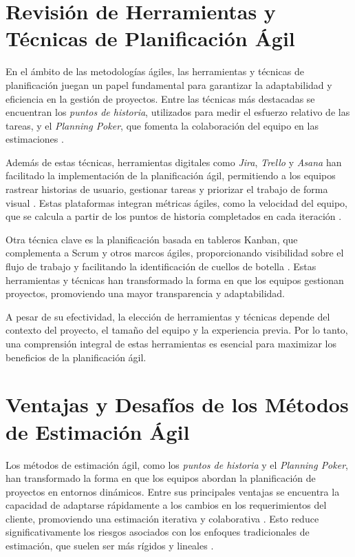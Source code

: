 \section{Revisión de Herramientas y Técnicas de Planificación Ágil}
En el ámbito de las metodologías ágiles, las herramientas y técnicas de planificación juegan un papel fundamental para garantizar la adaptabilidad y eficiencia en la gestión de proyectos. Entre las técnicas más destacadas se encuentran los \textit{puntos de historia}, utilizados para medir el esfuerzo relativo de las tareas, y el \textit{Planning Poker}, que fomenta la colaboración del equipo en las estimaciones \parencite{cohn2005agileestimating}.

Además de estas técnicas, herramientas digitales como \textit{Jira}, \textit{Trello} y \textit{Asana} han facilitado la implementación de la planificación ágil, permitiendo a los equipos rastrear historias de usuario, gestionar tareas y priorizar el trabajo de forma visual \parencite{rubin2012essential}. Estas plataformas integran métricas ágiles, como la velocidad del equipo, que se calcula a partir de los puntos de historia completados en cada iteración \parencite{schwaber2020scrumguide}.

Otra técnica clave es la planificación basada en tableros Kanban, que complementa a Scrum y otros marcos ágiles, proporcionando visibilidad sobre el flujo de trabajo y facilitando la identificación de cuellos de botella \parencite{anderson2010kanban}. Estas herramientas y técnicas han transformado la forma en que los equipos gestionan proyectos, promoviendo una mayor transparencia y adaptabilidad.

A pesar de su efectividad, la elección de herramientas y técnicas depende del contexto del proyecto, el tamaño del equipo y la experiencia previa. Por lo tanto, una comprensión integral de estas herramientas es esencial para maximizar los beneficios de la planificación ágil.

\section{Ventajas y Desafíos de los Métodos de Estimación Ágil}
Los métodos de estimación ágil, como los \textit{puntos de historia} y el \textit{Planning Poker}, han transformado la forma en que los equipos abordan la planificación de proyectos en entornos dinámicos. Entre sus principales ventajas se encuentra la capacidad de adaptarse rápidamente a los cambios en los requerimientos del cliente, promoviendo una estimación iterativa y colaborativa \parencite{cohn2005agileestimating}. Esto reduce significativamente los riesgos asociados con los enfoques tradicionales de estimación, que suelen ser más rígidos y lineales \parencite{rubin2012essential}.

